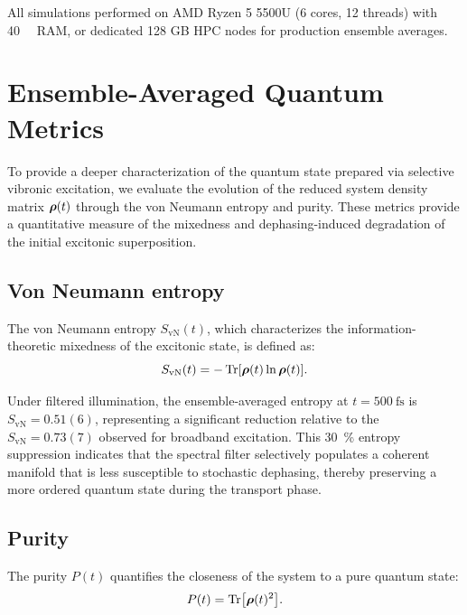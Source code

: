 \documentclass[11pt,a4paper]{article}
\begin{document}
All simulations performed on AMD Ryzen 5 5500U (6 cores, 12 threads) with \SI{40}{\giga\byte} RAM, or dedicated 128 GB HPC nodes for production ensemble averages.


\section{Ensemble-Averaged Quantum Metrics}
\label{sec:S6}

To provide a deeper characterization of the quantum state prepared via selective vibronic excitation, we evaluate the evolution of the reduced system density matrix $\vb*{\rho}(t)$ through the von Neumann entropy and purity. These metrics provide a quantitative measure of the mixedness and dephasing-induced degradation of the initial excitonic superposition.

\subsection{Von Neumann entropy}

The von Neumann entropy $S_{\mathrm{vN}}(t)$, which characterizes the information-theoretic mixedness of the excitonic state, is defined as:
\begin{equation}
S_{\mathrm{vN}}(t) = -\Tr[\vb*{\rho}(t)\ln\vb*{\rho}(t)].
\label{eq:SI_von_neumann}
\end{equation}

Under filtered illumination, the ensemble-averaged entropy at $t = \SI{500}{\femto\second}$ is $S_{\mathrm{vN}} = 0.51(6)$, representing a significant reduction relative to the $S_{\mathrm{vN}} = 0.73(7)$ observed for broadband excitation. This \SI{30}{\percent} entropy suppression indicates that the spectral filter selectively populates a coherent manifold that is less susceptible to stochastic dephasing, thereby preserving a more ordered quantum state during the transport phase.

\subsection{Purity}

The purity $P(t)$ quantifies the closeness of the system to a pure quantum state:
\begin{equation}
P(t) = \Tr[\vb*{\rho}(t)^2].
\label{eq:SI_purity}
\end{equation}
\end{document}
